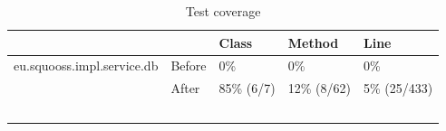 \documentclass{article}
\begin{document}
\begin{table}[h]
	\centering
    \begin{tabular}{ll|lll}
    ~                          & ~      & Class      & Method      & Line         \\ \hline
    eu.squooss.impl.service.db & Before & 0\%        & 0\%         & 0\%          \\
    ~                          & After  & 85\% (6/7) & 12\% (8/62) & 5\% (25/433) \\ \hline
    ~                          & ~      & ~          & ~           & ~            \\
    \end{tabular}
    \caption{Test coverage}
    \label{tbl:coverage}
\end{table}



\end{document}
